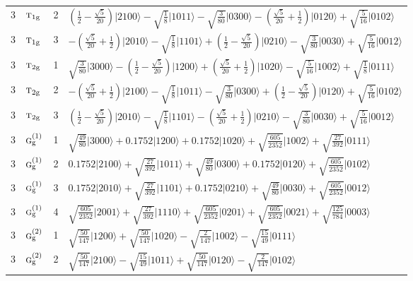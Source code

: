 \documentclass[11pt]{article}
\newcommand{\irr}[1]{\text{\normalfont\scshape #1}}
\newcommand{\ptag}[1]{\mathrm{#1}}
\newcommand{\occ}[1]{\lvert #1\rangle}
\begin{document}
\begin{longtable}{c l c p{}}
3 & $\irr{t}_{1\ptag{g}}$ & 2 & $(\frac{1}{2} - \frac{\sqrt{5}}{20})\occ{2100}-\sqrt{\tfrac{1}{8}}\occ{1011}-\sqrt{\tfrac{3}{80}}\occ{0300}-(\frac{\sqrt{5}}{20} + \frac{1}{2})\occ{0120}+\sqrt{\tfrac{5}{16}}\occ{0102}$\\
3 & $\irr{t}_{1\ptag{g}}$ & 3 & $-(\frac{\sqrt{5}}{20} + \frac{1}{2})\occ{2010}-\sqrt{\tfrac{1}{8}}\occ{1101}+(\frac{1}{2} - \frac{\sqrt{5}}{20})\occ{0210}-\sqrt{\tfrac{3}{80}}\occ{0030}+\sqrt{\tfrac{5}{16}}\occ{0012}$\\
3 & $\irr{t}_{2\ptag{g}}$ & 1 & $\sqrt{\tfrac{3}{80}}\occ{3000}-(\frac{1}{2} - \frac{\sqrt{5}}{20})\occ{1200}+(\frac{\sqrt{5}}{20} + \frac{1}{2})\occ{1020}-\sqrt{\tfrac{5}{16}}\occ{1002}+\sqrt{\tfrac{1}{8}}\occ{0111}$\\
3 & $\irr{t}_{2\ptag{g}}$ & 2 & $-(\frac{\sqrt{5}}{20} + \frac{1}{2})\occ{2100}-\sqrt{\tfrac{1}{8}}\occ{1011}-\sqrt{\tfrac{3}{80}}\occ{0300}+(\frac{1}{2} - \frac{\sqrt{5}}{20})\occ{0120}+\sqrt{\tfrac{5}{16}}\occ{0102}$\\
3 & $\irr{t}_{2\ptag{g}}$ & 3 & $(\frac{1}{2} - \frac{\sqrt{5}}{20})\occ{2010}-\sqrt{\tfrac{1}{8}}\occ{1101}-(\frac{\sqrt{5}}{20} + \frac{1}{2})\occ{0210}-\sqrt{\tfrac{3}{80}}\occ{0030}+\sqrt{\tfrac{5}{16}}\occ{0012}$\\
3 & $\irr{g}_{\ptag{g}}^{(1)}$ & 1 & $\sqrt{\tfrac{49}{80}}\occ{3000}+0.1752\occ{1200}+0.1752\occ{1020}+\sqrt{\tfrac{605}{2352}}\occ{1002}+\sqrt{\tfrac{27}{392}}\occ{0111}$\\
3 & $\irr{g}_{\ptag{g}}^{(1)}$ & 2 & $0.1752\occ{2100}+\sqrt{\tfrac{27}{392}}\occ{1011}+\sqrt{\tfrac{49}{80}}\occ{0300}+0.1752\occ{0120}+\sqrt{\tfrac{605}{2352}}\occ{0102}$\\
3 & $\irr{g}_{\ptag{g}}^{(1)}$ & 3 & $0.1752\occ{2010}+\sqrt{\tfrac{27}{392}}\occ{1101}+0.1752\occ{0210}+\sqrt{\tfrac{49}{80}}\occ{0030}+\sqrt{\tfrac{605}{2352}}\occ{0012}$\\
3 & $\irr{g}_{\ptag{g}}^{(1)}$ & 4 & $\sqrt{\tfrac{605}{2352}}\occ{2001}+\sqrt{\tfrac{27}{392}}\occ{1110}+\sqrt{\tfrac{605}{2352}}\occ{0201}+\sqrt{\tfrac{605}{2352}}\occ{0021}+\sqrt{\tfrac{125}{784}}\occ{0003}$\\
3 & $\irr{g}_{\ptag{g}}^{(2)}$ & 1 & $\sqrt{\tfrac{50}{147}}\occ{1200}+\sqrt{\tfrac{50}{147}}\occ{1020}-\sqrt{\tfrac{2}{147}}\occ{1002}-\sqrt{\tfrac{15}{49}}\occ{0111}$\\
3 & $\irr{g}_{\ptag{g}}^{(2)}$ & 2 & $\sqrt{\tfrac{50}{147}}\occ{2100}-\sqrt{\tfrac{15}{49}}\occ{1011}+\sqrt{\tfrac{50}{147}}\occ{0120}-\sqrt{\tfrac{2}{147}}\occ{0102}$\\

\end{longtable}
\end{document}
